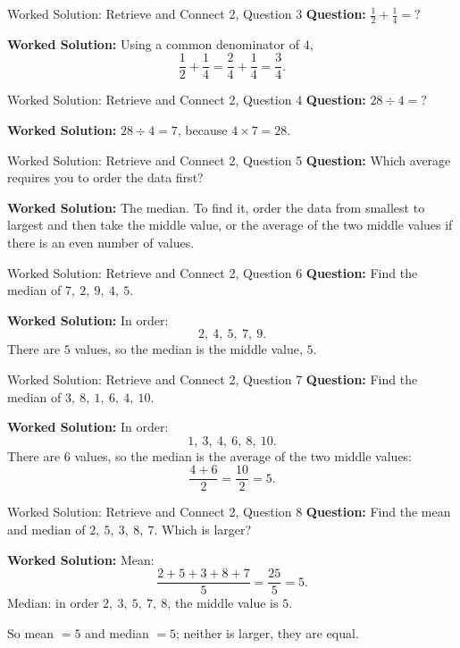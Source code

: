 \documentclass{beamer}
\begin{document}
\begin{frame}{Worked Solution: Retrieve and Connect 2, Question 3}
\small
\textbf{Question:} \(\frac12+\frac14=\mathord{?}\)

\smallskip
\textbf{Worked Solution:} Using a common denominator of \(4\),
\[
\frac12+\frac14=\frac24+\frac14=\frac34.
\]
\end{frame}

\begin{frame}{Worked Solution: Retrieve and Connect 2, Question 4}
\small
\textbf{Question:} \(28 \div 4=\mathord{?}\)

\smallskip
\textbf{Worked Solution:} \(28 \div 4 = 7\), because \(4 \times 7 = 28\).
\end{frame}

\begin{frame}{Worked Solution: Retrieve and Connect 2, Question 5}
\small
\textbf{Question:} Which average requires you to order the data first?

\smallskip
\textbf{Worked Solution:} The median. To find it, order the data from smallest to largest and then take the middle value, or the average of the two middle values if there is an even number of values.
\end{frame}

\begin{frame}{Worked Solution: Retrieve and Connect 2, Question 6}
\small
\textbf{Question:} Find the median of \(7,\ 2,\ 9,\ 4,\ 5\).

\smallskip
\textbf{Worked Solution:} In order:
\[
2,\ 4,\ 5,\ 7,\ 9.
\]
There are \(5\) values, so the median is the middle value, \(5\).
\end{frame}

\begin{frame}{Worked Solution: Retrieve and Connect 2, Question 7}
\small
\textbf{Question:} Find the median of \(3,\ 8,\ 1,\ 6,\ 4,\ 10\).

\smallskip
\textbf{Worked Solution:} In order:
\[
1,\ 3,\ 4,\ 6,\ 8,\ 10.
\]
There are \(6\) values, so the median is the average of the two middle values:
\[
\frac{4+6}{2}=\frac{10}{2}=5.
\]
\end{frame}

\begin{frame}{Worked Solution: Retrieve and Connect 2, Question 8}
\small
\textbf{Question:} Find the mean and median of \(2,\ 5,\ 3,\ 8,\ 7\). Which is larger?

\smallskip
\textbf{Worked Solution:} Mean:
\[
\frac{2+5+3+8+7}{5}=\frac{25}{5}=5.
\]
Median: in order \(2,\ 3,\ 5,\ 7,\ 8\), the middle value is \(5\).

So mean \(=5\) and median \(=5\); neither is larger, they are equal.
\end{frame}
\end{document}
